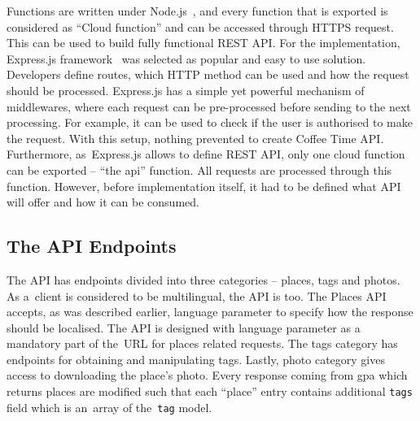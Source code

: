 Functions are written under Node.js~\cite{node-js}, and every function that is exported is considered as ``Cloud function'' and can be accessed through HTTPS request. This can be used to build fully functional REST API. For the implementation, Express.js framework~\cite{express-js} was selected as popular and easy to use solution. Developers define routes, which HTTP method can be used and how the request should be processed. 
Express.js has a simple yet powerful mechanism of middlewares, where each request can be pre-processed before sending to the next processing. For example, it can be used to check if the user is authorised to make the request. With this setup, nothing prevented to create Coffee Time API. Furthermore, as~Express.js allows to define REST API, only one cloud function can be exported -- ``the api'' function. All requests are processed through this function. However, before implementation itself, it had to be defined what API will offer and how it can be consumed. 
\subsection{The API Endpoints}
The API has endpoints divided into three categories -- places, tags and photos. As a~client is considered to be multilingual, the API is too. The Places API accepts, as was described earlier, language parameter to specify how the response should be localised. The API is designed with language parameter as a mandatory part of the~URL for places related requests. The tags category has endpoints for obtaining and manipulating tags. Lastly, photo category gives access to downloading the place's photo. Every response coming from \gls{gpa} which returns places are modified such that each ``place'' entry contains additional \verb|tags| field which is an~array of the~\verb|tag| model. 

